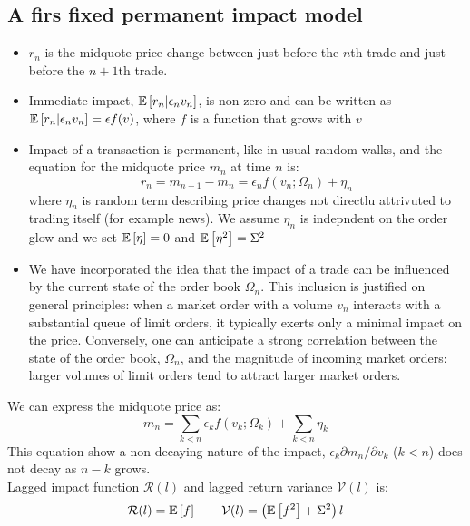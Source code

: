 \subsection{A firs fixed permanent impact model}
\begin{mysetting}
	\begin{itemize}
		\item $r_n$ is the midquote price change between just before the $n$th trade and just before the $n + 1$th trade.
		\item Immediate impact, $\mathbb{E}\left[r_n | \epsilon_n v_n\right]$, is non zero and can be written as $\mathbb{E}\left[r_n | \epsilon_n v_n\right] = \epsilon f(v)$, where $f$ is a function that grows with $v$
		\item Impact of a transaction is permanent, like in usual random walks, and the equation for the midquote price $m_n$ at time $n$ is:
		\[
		r_n = m_{n+1} - m_n = \epsilon_n f(v_n;\Omega_n) + \eta_n
		\]
		where $\eta_n$ is random term describing price changes not directlu attrivuted to trading itself (for example news). We assume $\eta_n$ is indepndent on the order glow and we set $\mathbb{E}\left[\eta\right] = 0$ and $\mathbb{E}\left[\eta^2\right] = \Sigma^2$
	\end{itemize}
\end{mysetting}
\begin{mysetting}
	\begin{itemize}
				\item We have incorporated the idea that the impact of a trade can be influenced by the current state of the order book $\Omega_n$. This inclusion is justified on general principles: when a market order with a volume $v_n$ interacts with a substantial queue of limit orders, it typically exerts only a minimal impact on the price. Conversely, one can anticipate a strong correlation between the state of the order book, $\Omega_n$, and the magnitude of incoming market orders: larger volumes of limit orders tend to attract larger market orders.
	\end{itemize}
\end{mysetting}
We can express the midquote price as:
\[
m_n = \sum_{k<n} \epsilon_k f(v_k; \Omega_k) + \sum_{k<n} \eta_k
\]
This equation show a non-decaying nature of the impact, $\epsilon_k \partial m_n/ \partial v_k$ ($k <n$) does not decay as $n-k$ grows.\\
Lagged impact function $\mathcal{R}(l)$ and lagged return variance $\mathcal{V}(l)$ is:
\[
\mathcal{R}(l) = \mathbb{E}\left[f\right] \qquad \mathcal{V}(l) = \left(\mathbb{E}\left[f^2\right] + \Sigma^2\right)l
\]
